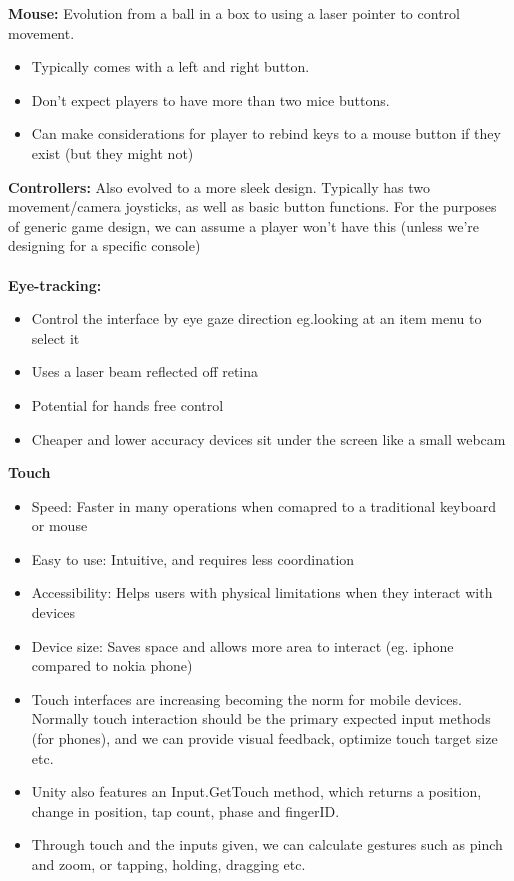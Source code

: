 \documentclass[a4paper,10pt]{article}
\begin{document}
\textcolor{Cerulean}{\textbf{Mouse:}} Evolution from a ball in a box to using a laser pointer to control movement. 
\renewcommand{\labelitemi}{\textperiodcentered}
\begin{itemize}
\item Typically comes with a left and right button. 
\item Don't expect players to have more than two mice buttons.
\item Can make considerations for player to rebind keys to a mouse button if they exist (but they might not)
\end{itemize}
\textcolor{Cerulean}{\textbf{Controllers:}} Also evolved to a more sleek design. Typically has two movement/camera joysticks, as well as basic button functions. For the purposes of generic game design, we can assume a player won't have this (unless we're designing for a specific console) \\\\
\newpage
\textcolor{Cerulean}{\textbf{Eye-tracking:}}
\renewcommand{\labelitemi}{\textperiodcentered}
\begin{itemize}
\item Control the interface by eye gaze direction eg.looking at an item menu to select it 
\item Uses a laser beam reflected off retina 
\item Potential for hands free control 
\item Cheaper and lower accuracy devices sit under the screen like a small webcam
\end{itemize}
\textcolor{Cerulean}{\textbf{Touch}}
\renewcommand{\labelitemi}{\textperiodcentered}
\begin{itemize}
\item Speed: Faster in many operations when comapred to a traditional keyboard or mouse 
\item Easy to use: Intuitive, and requires less coordination 
\item Accessibility: Helps users with physical limitations when they interact with devices 
\item Device size: Saves space and allows more area to interact (eg. iphone compared to nokia phone) 
\item Touch interfaces are increasing becoming the norm for mobile devices. Normally touch interaction should be the primary expected input methods (for phones), and we can provide visual feedback, optimize touch target size etc.
\item Unity also features an Input.GetTouch method, which returns a position, change in position, tap count, phase and fingerID. 
\item Through touch and the inputs given, we can calculate gestures such as pinch and zoom, or tapping, holding, dragging etc.
\end{itemize}
\end{document}
